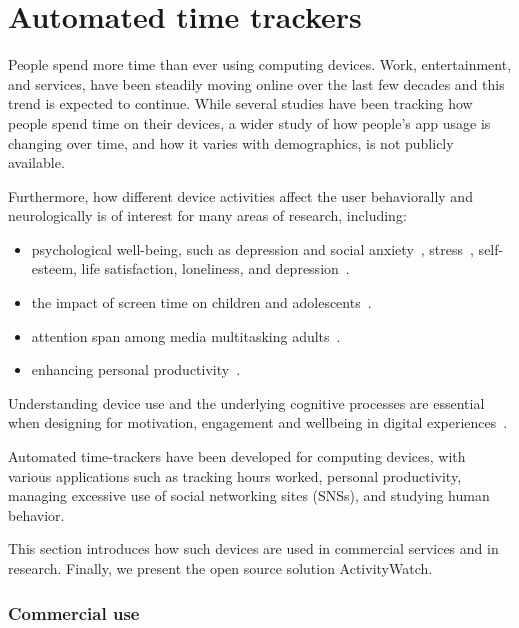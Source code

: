 \vfill
\pagebreak
\section{Automated time trackers}

    People spend more time than ever using computing devices. Work, entertainment, and services, have been steadily moving online over the last few decades and this trend is expected to continue.
    While several studies have been tracking how people spend time on their devices, a wider study of how people's app usage is changing over time, and how it varies with demographics, is not publicly available.

    Furthermore, how different device activities affect the user behaviorally and neurologically is of interest for many areas of research, including:

    \begin{itemize}
        \item psychological well-being, such as depression and social anxiety~\cite{selfhout_different_2009}\cite{shah_nonrecursive_2002}, stress~\cite{mark_stress_2014}, self-esteem, life satisfaction, loneliness, and depression~\cite{huang_time_2017}.
        \item the impact of screen time on children and adolescents~\cite{subrahmanyam_impact_2001}.
        \item attention span among media multitasking adults~\cite{mark_stress_2014}.
        \item enhancing personal productivity~\cite{kim_timeaware_2016}.
    \end{itemize}

    Understanding device use and the underlying cognitive processes are essential when designing for motivation, engagement and wellbeing in digital experiences~\cite{peters_designing_2018}.

    Automated time-trackers have been developed for computing devices, with various applications such as tracking hours worked, personal productivity, managing excessive use of social networking sites (SNSs), and studying human behavior.

    This section introduces how such devices are used in commercial services and in research. Finally, we present the open source solution ActivityWatch.

    \subsubsection*{Commercial use}

